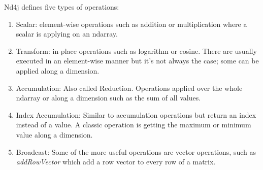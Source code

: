 Nd4j defines five types of operations:
\begin{enumerate}
\item Scalar: element-wise operations such as addition or multiplication where a scalar is applying on an ndarray.
\item Transform: in-place operations such as logarithm or cosine. There are usually executed in an element-wise manner but it's not always the case; some can be applied along a dimension.
\item Accumulation: Also called Reduction. Operations applied over the whole ndarray or along a dimension such as the sum of all values.
\item Index Accumulation: Similar to accumulation operations but return an index instead of a value. A classic operation is getting the maximum or minimum value along a dimension.
\item Broadcast: Some of the more useful operations are vector operations, such as \textit{addRowVector} which add a row vector to every row of a matrix.
\end{enumerate}

